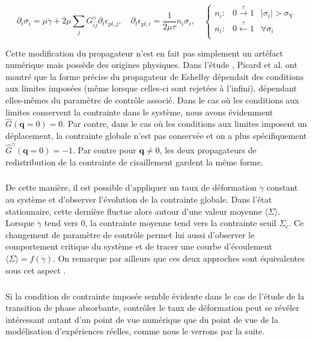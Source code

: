 \begin{equation}
	\partial_t\sigma_i = \mu\dot{\gamma} + 2\mu\sum_{j}G^{\dot{\gamma}}_{ij}\partial_t \epsilon_{pl,j},\quad \partial_t \epsilon_{pl,i} = \frac{1}{2\mu\tau}n_i \sigma_i,\quad
	\left\{
    \begin{array}{lcc}
    n_i: & 0\xrightarrow{\tau}1 & |\sigma_i|>\sigma_\mathrm{Y} \\
    n_i: & 0\xleftarrow{\tau}1 & \forall \sigma_i\\
    \end{array}
    \right.
\end{equation}

\noindent Cette modification du propagateur n'est en fait pas simplement un artéfact numérique mais possède des origines physiques. Dans l'étude \cite{picard_elastic_2004}, Picard et al. ont montré que la forme précise du propagateur de Eshelby dépendait des conditions aux limites imposées (même lorsque celles-ci sont rejetées à l'infini), dépendant elles-mêmes du paramètre de contrôle associé. Dans le cas où les conditions aux limites conservent la contrainte dans le système, nous avons évidemment $\hat{G}(\mathbf{q}=0) = 0$. Par contre, dans le cas où les conditions aux limites imposent un déplacement, la contrainte globale n'est pas conservée et on a plus spécifiquement $\hat{G}^{\dot{\gamma}}(\mathbf{q}=0) = -1$. Par contre pour $\mathbf{q}\neq 0$, les deux propagateurs de redistribution de la contrainte de cisaillement gardent la même forme.

\subparagraph{}De cette manière, il est possible d'appliquer un taux de déformation $\dot{\gamma}$ constant au système et d'observer l'évolution de la contrainte globale. Dans l'état stationnaire, cette dernière fluctue alors autour d'une valeur moyenne $\langle \Sigma\rangle$. Lorsque $\dot{\gamma}$ tend vers $0$, la contrainte moyenne tend vers la contrainte seuil $\Sigma_c$. Ce changement de paramètre de contrôle permet lui aussi d'observer le comportement critique du système et de tracer une courbe d'écoulement $\langle \Sigma \rangle = f(\dot{\gamma})$. On remarque par ailleurs que ces deux approches sont équivalentes sous cet aspect \cite{liu_driving_2016}.

\subparagraph{}Si la condition de contrainte imposée semble évidente dans le cas de l'étude de la transition de phase absorbante, contrôler le taux de déformation peut se révéler intéressant autant d'un point de vue numérique que du point de vue de la modélisation d'expériences réelles, comme nous le verrons par la suite.


